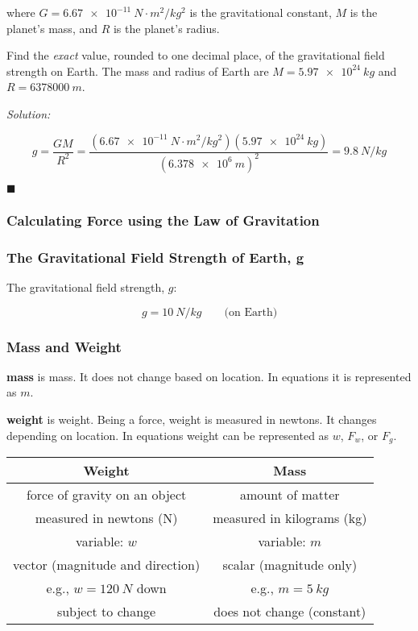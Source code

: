 \documentclass[dvipsnames]{article}
\begin{document}
where $G = \SI{6.67e-11}{N\cdot m^2/kg^2}$ is the gravitational constant, $M$ is the planet's mass, and $R$ is the planet's radius.

\begin{example}
    Find the \textit{exact} value, rounded to one decimal place, of the gravitational field strength on Earth. The mass and radius of Earth are $M = \SI{5.97e24}{kg}$ and $R = \SI[group-separator={,}]{6378000}{m}$. 
\end{example}

\textit{Solution:}

\begin{equation*}
    g = \frac{GM}{R^2} = \frac{(\SI{6.67e-11}{N\cdot m^2/kg^2})(\SI{5.97e24}{kg})}{(\SI{6.378e6}{m})^2} = \boxed{\SI{9.8}{N/kg}}
\end{equation*}

\hfill $\blacksquare$

\subsubsection{Calculating Force using the Law of Gravitation}

\subsubsection{The Gravitational Field Strength of Earth, g}


The gravitational field strength, $g$:

\begin{equation*}
    g = \SI{10}{N/kg} \qquad \text{(on Earth)}
\end{equation*}

\subsubsection{Mass and Weight}

\textbf{\Gls{mass}} is \glsdesc{mass}. It does not change based on location. In equations it is represented as $m$.

\textbf{\Gls{weight}} is \glsdesc{weight}. Being a force, weight is measured in newtons. It changes depending on location. In equations weight can be represented as $w$, $F_w$, or $F_g$.

\begin{center}
    \begin{tabular}{c|c}
        \textbf{Weight} & \textbf{Mass} \\ \hline
        force of gravity on an object & amount of matter \\ \hline
        measured in newtons (N) & measured in kilograms (kg) \\ \hline
        variable: $w$ & variable: $m$ \\ \hline
        vector (magnitude and direction) & scalar (magnitude only) \\ \hline
        e.g., $w = \SI{120}{N}$ down & e.g., $m = \SI{5}{kg}$ \\ \hline
        subject to change & does not change (constant) 
    \end{tabular}
\end{center}
\end{document}
